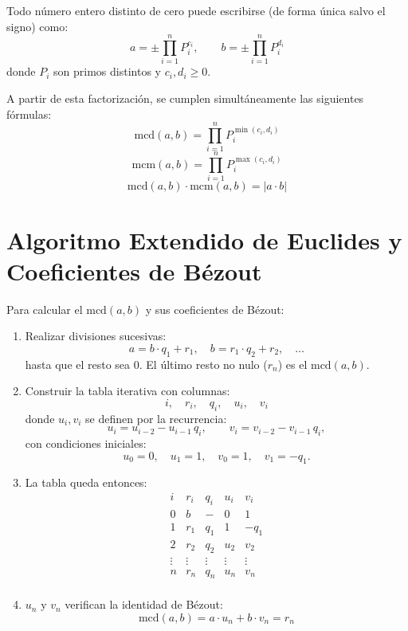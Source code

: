 \documentclass[a4paper,12pt]{article}
\begin{document}
\begin{procedimiento}[title={Factorización prima y fórmulas de MCD y MCM}]
Todo número entero distinto de cero puede escribirse (de forma única salvo el signo) como:
\[
a = \pm \displaystyle\prod_{i=1}^{n} P_i^{c_i}, \qquad 
b = \pm \displaystyle\prod_{i=1}^{n} P_i^{d_i}
\]
donde \( P_i \) son primos distintos y \( c_i, d_i \geq 0 \).

A partir de esta factorización, se cumplen simultáneamente las siguientes fórmulas:
\[
\text{mcd}(a,b) = \displaystyle\prod_{i=1}^{n} P_i^{\min(c_i, d_i)}
\]
\[
\text{mcm}(a,b) = \displaystyle\prod_{i=1}^{n} P_i^{\max(c_i, d_i)}
\]
\[
\text{mcd}(a,b) \cdot \text{mcm}(a,b) = |a \cdot b|
\]

\end{procedimiento}

\section{Algoritmo Extendido de Euclides y Coeficientes de Bézout}

\begin{procedimiento}[title={Pasos del Algoritmo Extendido de Euclides}]
Para calcular el \(\text{mcd}(a,b)\) y sus coeficientes de Bézout:

\begin{enumerate}
    \item Realizar divisiones sucesivas:
    \[
    a = b \cdot q_1 + r_1, \quad
    b = r_1 \cdot q_2 + r_2, \quad \ldots
    \]
    hasta que el resto sea \(0\). El último resto no nulo ($r_n$) es el \(\text{mcd}(a,b)\).

    \item Construir la tabla iterativa con columnas:
    \[
    i,\quad r_i,\quad q_i,\quad u_i,\quad v_i
    \]
    donde \(u_i, v_i\) se definen por la recurrencia:
    \[
    u_i = u_{i-2} - u_{i-1}\,q_i, \qquad
    v_i = v_{i-2} - v_{i-1}\,q_i,
    \]
    con condiciones iniciales:
    \[
    u_0 = 0, \quad u_1 = 1, \quad v_0 = 1, \quad v_1 = -q_1.
    \]

    \item La tabla queda entonces:
    \[
    \begin{array}{c|c|c|c|c}
    i & r_i & q_i & u_i & v_i \\
    \hline
    0 & b & - & 0 & 1 \\
    1 & r_1 & q_1 & 1 & -q_1 \\
    2 & r_2 & q_2 & u_2 & v_2 \\
    \vdots & \vdots & \vdots & \vdots & \vdots \\
    n & \boxed{r_n} & q_n & u_n & v_n \\
    \end{array}
    \]

    \item \(u_n\) y \(v_n\) verifican la identidad de Bézout:
    \[
    \text{mcd}(a,b) = a \cdot u_n + b \cdot v_n = \boxed{r_n}
    \]
\end{enumerate}
\end{procedimiento}
\end{document}
